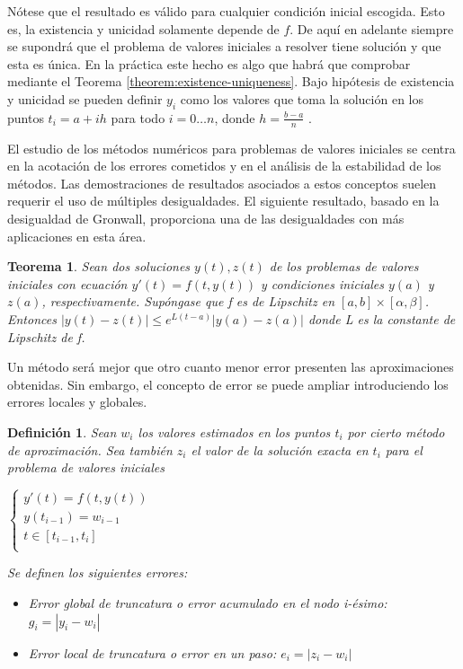 \documentclass{article}
\theoremstyle{theorem-style}  %
\newtheorem{theorem}{Teorema}[section]  %
\theoremstyle{definition-style}
\newtheorem{definition}{Definición}[section]
\theoremstyle{example-style}
\begin{document}
	Nótese que el resultado es válido para cualquier condición inicial escogida. Esto es, la existencia y unicidad solamente depende de $f$. De aquí en adelante siempre se supondrá que el problema de valores iniciales a resolver tiene solución y que esta es única. En la práctica este hecho es algo que habrá que comprobar mediante el Teorema \ref{theorem:existence-uniqueness}. Bajo hipótesis de existencia y unicidad se pueden definir $y_i$ como los valores que toma la solución en los puntos $t_i = a + ih$ para todo $i = 0 \ldots n$, donde $h = \frac{b-a}{n}$ .
 
	El estudio de los métodos numéricos para problemas de valores iniciales se centra en la acotación de los errores cometidos y en el análisis de la estabilidad de los métodos. Las demostraciones de resultados asociados a estos conceptos suelen requerir el uso de múltiples desigualdades. El siguiente resultado, basado en la desigualdad de Gronwall, proporciona una de las desigualdades con más aplicaciones en esta área.
	
	\begin{theorem}
		Sean dos soluciones $y(t), z(t)$ de los problemas de valores iniciales con ecuación $y'(t) = f(t,y(t))$ y condiciones iniciales $y(a)$ y $z(a)$, respectivamente. Supóngase que f es de Lipschitz en $[a,b]\times[\alpha,\beta]$. Entonces $|y(t)-z(t)| \leq e^{L(t-a)}|y(a)-z(a)|$ donde L es la constante de Lipschitz de f.
	\end{theorem}

	Un método será mejor que otro cuanto menor error presenten las aproximaciones obtenidas. Sin embargo, el concepto de error se puede ampliar introduciendo los errores locales y globales.
	
	\begin{definition} 
		Sean $w_i$ los valores estimados en los puntos $t_i$ por cierto método de aproximación. Sea también $z_i$ el valor de la solución exacta en $t_i$ para el problema de valores iniciales
		
		\begin{center}
			$\begin{cases}
			y'(t) = f(t,y(t)) \\
			y(t_{i-1}) = w_{i-1} \\
			t \in [t_{i-1},t_{i}] \\
			\end{cases}$
		\end{center}

		Se definen los siguientes errores:
	
		\begin{itemize}
			\item Error global de truncatura o error acumulado en el nodo i-ésimo: $g_i=|y_i - w_i|$
			\item Error local de truncatura o error en un paso: $e_i = |z_i - w_i|$
		\end{itemize} 
	\end{definition}
	
\end{document}
